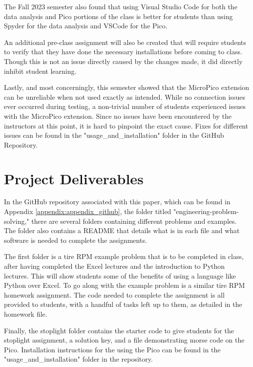 The Fall 2023 semester also found that using Visual Studio Code for both the data analysis and Pico portions of the
class is better for students than using Spyder for the data analysis and VSCode for the Pico. 

An additional pre-class assignment will also be created that will require students to verify that they have
done the necessary installations before coming to class. Though this is not an issue directly caused by the changes
made, it did directly inhibit student learning.

Lastly, and most concerningly, this semester showed that the MicroPico extension can be unreliable when not used
exactly as intended. While no connection issues ever occurred during testing, a non-trivial number of students
experienced issues with the MicroPico extension. Since no issues have been encountered by the instructors at this
point, it is hard to pinpoint the exact cause. Fixes for different issues can be found in the 
"usage\_and\_installation" folder in the GitHub Repository.

\section{Project Deliverables}

In the GitHub repository associated with this paper, which can be found in Appendix \ref{appendix:appendix_github},
the folder titled "engineering-problem-solving," there are several folders containing different problems and 
examples. The folder also contains a README that details what is in each file and what software is needed to 
complete the assignments. 

The first folder is a tire RPM example problem that is to be completed in class, after having completed the Excel
lectures and the introduction to Python lectures. This will show students some of the benefits of using a
language like Python over Excel. To go along with the example problem is a similar tire RPM homework assignment.
The code needed to complete the assignment is all provided to students, with a handful of tasks left up to them,
as detailed in the homework file. 

Finally, the stoplight folder contains the starter code to give students for the stoplight assignment, a solution
key, and a file demonstrating morse code on the Pico. Installation instructions for the using the Pico can be found
in the "usage\_and\_installation" folder in the repository.
